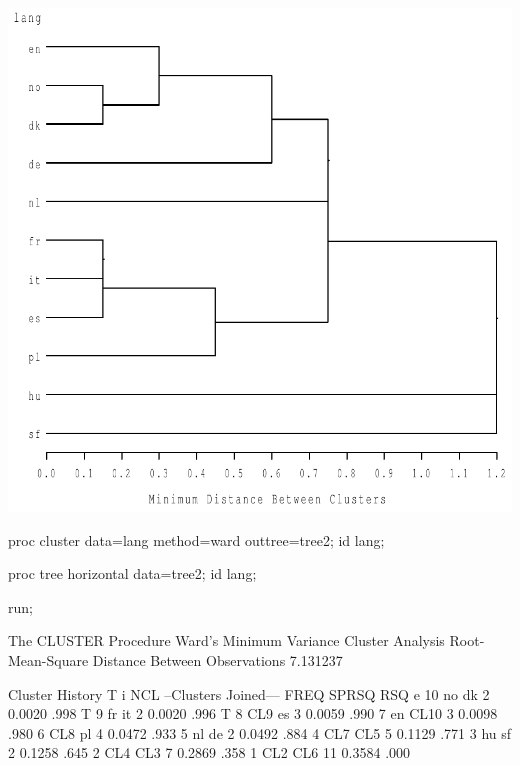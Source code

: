 \documentclass{article}
\begin{document}
\includegraphics[]{one-ten-1-SAS-fig.pdf}
\begin{Winput}

proc cluster data=lang method=ward outtree=tree2;
  id lang;

proc tree horizontal data=tree2;
  id lang;


run;

\end{Winput}
\begin{Woutput}
The CLUSTER Procedure
Ward's Minimum Variance Cluster Analysis
Root-Mean-Square Distance Between Observations    7.131237

                        Cluster History
                                                              T
                                                              i
   NCL    --Clusters Joined---      FREQ     SPRSQ     RSQ    e
    10    no          dk               2    0.0020    .998    T
     9    fr          it               2    0.0020    .996    T
     8    CL9         es               3    0.0059    .990
     7    en          CL10             3    0.0098    .980
     6    CL8         pl               4    0.0472    .933
     5    nl          de               2    0.0492    .884
     4    CL7         CL5              5    0.1129    .771
     3    hu          sf               2    0.1258    .645
     2    CL4         CL3              7    0.2869    .358
     1    CL2         CL6             11    0.3584    .000
\end{Woutput}
\end{document}
